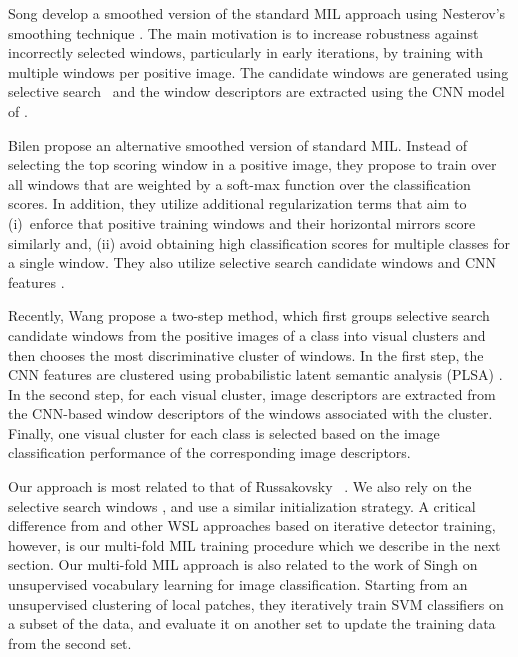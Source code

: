 \documentclass[10pt,journal,cspaper,final,twocolumn,compsoc]{./IEEEtran}
\begin{document}
Song \etal\cite{song14icml} develop a smoothed version of
the standard MIL approach using Nesterov's smoothing
technique \cite{nesterov05mathprog}.  The main motivation
is to increase robustness against incorrectly selected
windows, particularly in early iterations, by training
with multiple windows per positive image.  
The candidate windows are generated using selective
search~\cite{uijlings13ijcv} and the window descriptors
are extracted using the CNN model of 
\cite{krizhevsky12nips}.

Bilen \etal\cite{bilen14bmvc} propose an alternative
smoothed version of standard MIL. Instead of
selecting the top scoring window in a positive image, they
propose to train over all windows that are weighted by a
soft-max function over the classification scores. In
addition, they utilize additional regularization terms
that aim to (i)~enforce that positive training windows and
their horizontal mirrors score similarly and,
(ii) avoid obtaining high classification scores for
multiple classes for a single window. They also utilize selective search candidate
windows \cite{uijlings13ijcv} and  CNN features \cite{krizhevsky12nips}.

Recently, Wang \etal\cite{wang14eccv} propose a two-step
method, which first groups selective search candidate
windows \cite{uijlings13ijcv} from the positive images of
a class into visual clusters and then chooses the most
discriminative cluster of windows. In the first step, the CNN features \cite{krizhevsky12nips} are clustered using probabilistic
latent semantic analysis (PLSA) 
\cite{hofmann01ml}. 
In the second
step, for each visual cluster, image descriptors are extracted from the CNN-based window descriptors of the windows associated with the cluster. Finally, one visual
cluster for each class is selected based on the image
classification performance of the corresponding image
descriptors.

Our approach is most related to that of Russakovsky \etal
~\cite{russakovsky12eccv}. We also rely on the selective
search windows \cite{uijlings13ijcv}, and use a similar
initialization strategy. A critical  difference from
\cite{russakovsky12eccv} and other WSL approaches based on
iterative detector training, however, is our multi-fold
MIL training procedure which we describe in the next
section.  Our multi-fold MIL approach is also related to
the work of Singh \etal\cite{singh12eccv} on unsupervised
vocabulary learning for image classification.  Starting
from an unsupervised clustering of local patches, they
iteratively train SVM classifiers on a subset of the data,
and evaluate it on another set to update the training data
from the second set.  
\end{document}
